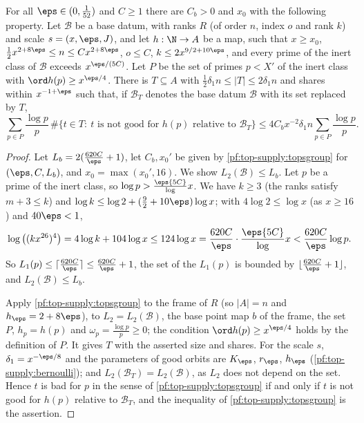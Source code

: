 \begin{proposition}\label{pf:top-supply:topsbase}
For all $\eps\in(0,\frac1{52})$ and $C\ge1$ there are $C_b>0$ and $x_0$ with the following property. Let $\mathcal B$ be a base
datum, with ranks $R$ (of order $n$, index $o$ and rank $k$) and scale $s=(x,\eps,J)$, and let $h:\N\to A$ be a map, such
that $x\ge x_0$, $\frac12x^{2+8\eps}\le n\le Cx^{2+8\eps}$, $o\le C$, $k\le2x^{9/2+10\eps}$, and every prime of the inert
class of $\mathcal B$ exceeds $x^{\eps/(5C)}$. Let $P$ be the set of primes $p<X'$ of the inert class with
$\ord h(p)\ge x^{\eps/4}$. There is $T\subseteq A$ with $\frac12\delta_1n\le|T|\le2\delta_1n$ and shares within $x^{-1+\eps}$
such that, if $\mathcal B_T$ denotes the base datum $\mathcal B$ with its set replaced by $T$,
\[
\sum_{p\in P}\frac{\log p}p\,\#\{t\in T:\ t\text{ is not good for }h(p)\text{ relative to }\mathcal B_T\}
\le4C_bx^{-2}\delta_1n\sum_{p\in P}\frac{\log p}p .
\]
\end{proposition}

\begin{proof}
Let $L_b=2(\frac{620C}\eps+1)$, let $C_b,x_0'$ be given by \cref{pf:top-supply:topsgroup} for $(\eps,C,L_b)$, and
$x_0=\max(x_0',16)$. We show $L_2(\mathcal B)\le L_b$. Let $p$ be a prime of the inert class, so $\log p>\frac\eps{5C}\log x$.
We have $k\ge3$ (the ranks satisfy $m+3\le k$) and $\log k\le\log2+(\frac92+10\eps)\log x$; with $4\log2\le\log x$ (as
$x\ge16$) and $40\eps<1$,
\[
\log\big((kx^{26})^4\big)=4\log k+104\log x\le124\log x=\frac{620C}\eps\cdot\frac\eps{5C}\log x<\frac{620C}\eps\log p .
\]
So $L_1(p)\le\lceil\frac{620C}\eps\rceil\le\frac{620C}\eps+1$, the set of the $L_1(p)$ is bounded by
$\lfloor\frac{620C}\eps+1\rfloor$, and $L_2(\mathcal B)\le L_b$.

Apply \cref{pf:top-supply:topsgroup} to the frame of $R$ (so $|A|=n$ and $h_\eps=2+8\eps$), to $L_2=L_2(\mathcal B)$, the base
point map $b$ of the frame, the set $P$, $h_p=h(p)$ and $\omega_p=\frac{\log p}p\ge0$; the condition $\ord h(p)\ge x^{\eps/4}$
holds by the definition of $P$. It gives $T$ with the asserted size and shares. For the scale $s$, $\delta_1=x^{-\eps/8}$ and
the parameters of good orbits are $K_\eps$, $r_\eps$, $h_\eps$ (\cref{pf:top-supply:bernoulli}); and
$L_2(\mathcal B_T)=L_2(\mathcal B)$, as $L_2$ does not depend on the set. Hence $t$ is bad for $p$ in the sense of
\cref{pf:top-supply:topsgroup} if and only if $t$ is not good for $h(p)$ relative to $\mathcal B_T$, and the inequality of
\cref{pf:top-supply:topsgroup} is the assertion.
\end{proof}

